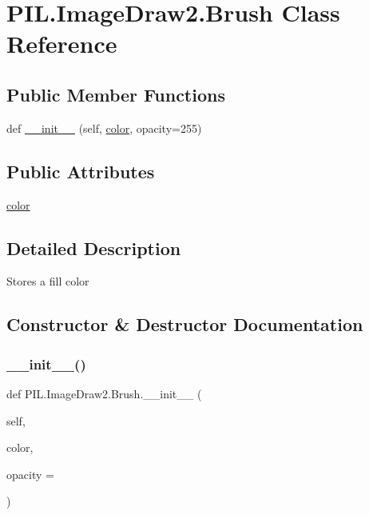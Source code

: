 \hypertarget{classPIL_1_1ImageDraw2_1_1Brush}{}\section{P\+I\+L.\+Image\+Draw2.\+Brush Class Reference}
\label{classPIL_1_1ImageDraw2_1_1Brush}
\subsection*{Public Member Functions}
\begin{DoxyCompactItemize}
\item 
def \hyperlink{classPIL_1_1ImageDraw2_1_1Brush_adf8c25bb818fb421137a1f12b557901d}{\+\_\+\+\_\+init\+\_\+\+\_\+} (self, \hyperlink{classPIL_1_1ImageDraw2_1_1Brush_a0d03d3bf1ae881c687a2f893a600b061}{color}, opacity=255)
\end{DoxyCompactItemize}
\subsection*{Public Attributes}
\begin{DoxyCompactItemize}
\item 
\hyperlink{classPIL_1_1ImageDraw2_1_1Brush_a0d03d3bf1ae881c687a2f893a600b061}{color}
\end{DoxyCompactItemize}


\subsection{Detailed Description}
\begin{DoxyVerb}Stores a fill color\end{DoxyVerb}
 

\subsection{Constructor \& Destructor Documentation}
\mbox{\label{classPIL_1_1ImageDraw2_1_1Brush_adf8c25bb818fb421137a1f12b557901d}} 
\subsubsection{\texorpdfstring{\+\_\+\+\_\+init\+\_\+\+\_\+()}{\_\_init\_\_()}}
{\footnotesize\ttfamily def P\+I\+L.\+Image\+Draw2.\+Brush.\+\_\+\+\_\+init\+\_\+\+\_\+ (\begin{DoxyParamCaption}\item[{}]{self,  }\item[{}]{color,  }\item[{}]{opacity = {} }\end{DoxyParamCaption})}




